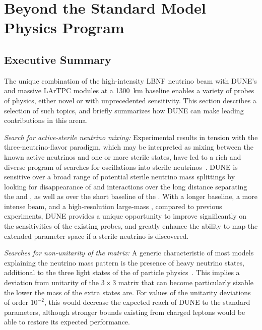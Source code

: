 \chapter{Beyond the Standard Model  Physics Program }
\label{ch:bsm}
\section{Executive Summary}
\label{phys:bsm:execsumm}

The unique combination of the high-intensity LBNF neutrino beam with DUNE's   and massive LArTPC  modules at a \SI{1300}{km} baseline enables a variety of probes of  physics, either novel or with unprecedented sensitivity. This section describes a selection of such topics, and briefly summarizes how DUNE can make leading contributions in this arena.

\textit{Search for active-sterile neutrino mixing:} Experimental results in tension with the three-neutrino-flavor paradigm, which may be interpreted as mixing between the known active neutrinos and one or more sterile states, have led to a rich and diverse program of searches for oscillations into sterile neutrinos~\cite{ref:tension,Gariazzo:2017fdh}. DUNE is sensitive over a broad range of potential sterile neutrino mass splittings by looking for disappearance of  and   interactions over the long distance separating the  and , as well as over the short baseline of the  . With a longer baseline, a more intense beam, and a high-resolution large-mass , compared to previous experiments, DUNE provides a unique opportunity to improve significantly on the sensitivities of the existing probes, and greatly enhance the ability to map the extended parameter space if a sterile neutrino is discovered.

\textit{Searches for non-unitarity of the  matrix:} A generic characteristic of most models explaining the neutrino mass pattern is the presence of heavy neutrino states, additional to the three light states of the  of particle physics~\cite{Minkowski:1977sc,Mohapatra:1979ia,Yanagida:1979as,GellMann:1980vs}. This implies a deviation from %
unitarity of the $3 \times 3$  matrix that can %
become particularly sizable the lower the mass of the extra states are.
For values of the unitarity deviations of order $10^{-2}$, this would decrease the expected reach of DUNE to the standard parameters, although stronger bounds existing from charged leptons would be able to restore its expected performance.


